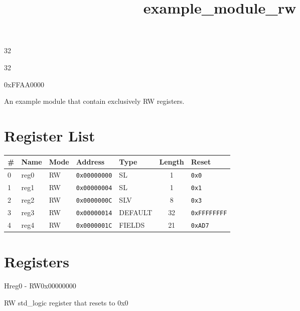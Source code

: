 \documentclass{article}
\title{example{\_}module{\_}rw}
\author{}
\date{}
\begin{document}
\maketitle

\begin{description}[leftmargin=!,labelwidth=\widthof{\bfseries Address width: }]
\item [Address width: ] 32
\item [Data width: ] 32
\item [Base address: ] 0xFFAA0000
\end{description}


An example module that contain exclusively RW registers.

\section{Register List}

\begin{table}[h!]
  \begin{center}
    \label{tab:table1}
    \begin{tabularx}{\linewidth}{|l|X|l|l|l|c|l|}
      \hline
      \textbf{\#} & \textbf{Name} & \textbf{Mode} & \textbf{Address} & \textbf{Type} & \textbf{Length} &
      \textbf{Reset} \\
      \hline
      0 & reg0 & RW & \texttt{0x00000000} & SL & 1 & \texttt{0x0} \\
      \hline
      1 & reg1 & RW & \texttt{0x00000004} & SL & 1 & \texttt{0x1} \\
      \hline
      2 & reg2 & RW & \texttt{0x0000000C} & SLV & 8 & \texttt{0x3} \\
      \hline
      3 & reg3 & RW & \texttt{0x00000014} & DEFAULT & 32 & \texttt{0xFFFFFFFF} \\
      \hline
      4 & reg4 & RW & \texttt{0x0000001C} & FIELDS & 21 & \texttt{0xAD7} \\
      \hline
    \end{tabularx}
  \end{center}
\end{table}

\section{Registers}

\begin{register}{H}{reg0 - RW}{0x00000000}
  \par RW std{\_}logic register that resets to 0x0 \regnewline
  \label{reg0}
\regnewline
\end{register}
\end{document}
